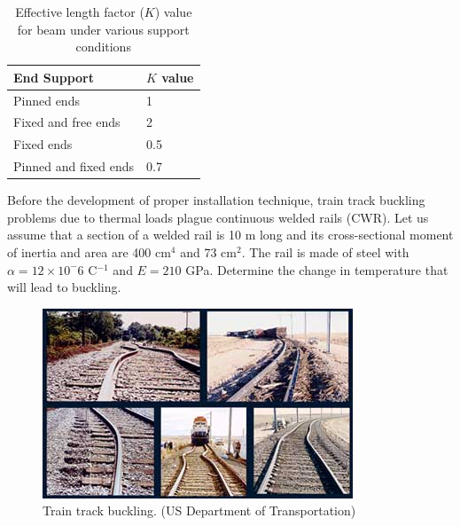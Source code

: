 \documentclass[
10pt,
a4paper,
openany,
svgnames,
]{book} %
\begin{document}
\begin{table}[h]
  \centering
  \caption{Effective length factor ($K$) value for beam under various support conditions}
  {\renewcommand{\arraystretch}{1.2}
  \begin{tabular}{ L{4.5cm} C{3cm} }
    \toprule
    End Support & $K$ value \\
    \midrule
    Pinned ends & 1 \\
    Fixed and free ends & 2 \\
    Fixed ends & 0.5 \\
    Pinned and fixed ends & 0.7 \\
    \bottomrule
  \end{tabular}}
\end{table}

\begin{example}
  Before the development of proper installation technique, train track buckling problems due to thermal loads plague continuous welded rails (CWR). Let us assume that a section of a welded rail is 10 m long and its cross-sectional moment of inertia and area are 400 cm$^4$ and 73 cm$^2$. The rail is made of steel with $\alpha = 12 \times 10^-6$ C$^{-1}$ and $E = 210$ GPa. Determine the change in temperature that will lead to buckling.

  \begin{figure}[H]
    \centering
    \includegraphics[scale=0.7]{pictures/Failure-theories/Rail_buckle}
    \caption{Train track buckling. (US Department of Transportation)}
  \end{figure}
\end{example}
\end{document}
